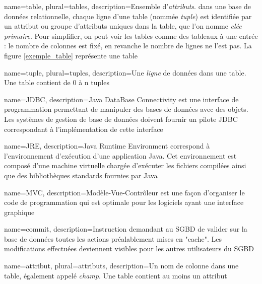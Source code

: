         {name={table},
        plural={tables},
        description={Ensemble d'\textit{attributs}.
        dans une base de données relationnelle, chaque ligne d'une table (nommée \textit{tuple}) est identifiée
        par un attribut ou groupe d'attributs
        uniques dans la table, que l'on nomme \textit{clée primaire}.
        Pour simplifier, on peut voir les tables comme des tableaux à une entrée : le nombre de colonnes est fixé, en revanche le nombre de lignes ne l'est pas. La figure \ref{exemple_table} représente une table}}

        {name={tuple},
        plural={tuples},
        description={Une \textit{ligne} de données dans une table. Une table contient de 0 à n tuples}}
        
        
{
  name=JDBC,
  description={Java DataBase Connectivity est une interface de programmation permettant de manipuler des bases de données avec des objets. Les systèmes de gestion de base de données doivent fournir un pilote JDBC correspondant à l'implémentation de cette interface}
}

{
  name=JRE,
  description={Java Runtime Environment correspond à l'environnement d'exécution d'une application Java. Cet environnement est composé d'une machine virtuelle chargée d'exécuter les fichiers compilées ainsi que des bibliothèques standards fournies par Java}
}

{
  name=MVC,
  description={Modèle-Vue-Contrôleur est une façon d'organiser le code de programmation qui est optimale pour les logiciels ayant une interface graphique}
}

{
  name=commit,
  description={Instruction demandant au SGBD de valider sur la base de données toutes les actions préalablement mises en "cache". Les modifications effectuées deviennent visibles pour les autres utilisateurs du SGBD}
}

        {name={attribut},
        plural={attributs},
        description={Un nom de colonne dans une table, également appelé \textit{champ}.
        Une table contient au moins un attribut}}
        



